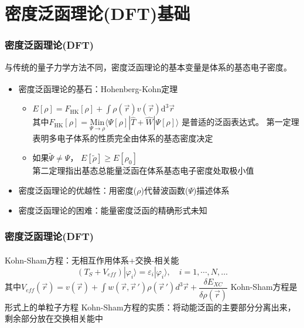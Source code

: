 \documentclass[cjk,slidestop,compress,mathserif,blue]{beamer}
\newcommand{\upcite}[1]{\hspace{0ex}\textsuperscript{\cite{#1}}} %
\begin{document}
\section{密度泛函理论(DFT)基础}       %
\frame                               %
{
\frametitle{密度泛函理论(\textrm{DFT})} %
与传统的量子力学方法不同，密度泛函理论的基本变量是体系的基态电子密度。%
\begin{itemize}%
	\item 密度泛函理论的基石：\textrm{Hohenberg-Kohn}定理\upcite{PR136-B864_1964}
\vskip 10pt
\begin{itemize}%
   \setlength{\itemsep}{15pt}
 \item $E[\rho]=F_{\mathrm{HK}}[\rho]+\displaystyle\int\rho(\vec{r})v(\vec{r})\textrm{d}^{3}\vec{r}$ \\
\vskip 5pt 其中$F_{\mathrm{HK}}[\rho]=\underset{\Psi\to\rho}{\mathrm{Min}}\langle\Psi[\rho]|\hat{T}+\hat{W}|\Psi[\rho]\rangle$
是普适的泛函表达式。%
     \textrm{\small{第一定理表明多电子体系的性质完全由体系的基态密度决定}}
   \item 如果$\tilde\Psi\neq\Psi$，
     $E[\tilde\rho]\geqslant E[\rho_0]$\\
     \textrm{\small{第二定理指出基态总能量泛函在体系基态电子密度处取极小值}}
   \end{itemize}
\vskip 15pt
 \item 密度泛函理论的优越性：用密度($\rho$)代替波函数($\Psi$)描述体系
\vskip 10pt
 \item 密度泛函理论的困难：能量密度泛函的精确形式未知
   \end{itemize}
}
\frame                               %
{
\frametitle{密度泛函理论(\textrm{DFT})}
\textrm{Kohn-Sham}方程\upcite{PR140-A1133_1965}：无相互作用体系+交换-相关能
$$(T_S+V_{e\!f\!f})|\varphi_i\rangle=\varepsilon_i|\varphi_i\rangle,\quad i=1,\cdots,N,\dots$$
其中$V_{e\!f\!f}(\vec r)=v(\vec r)+\displaystyle\int w(\vec r,\vec r\,')\rho(\vec r\,')d^3\vec r+\dfrac{\delta E_{XC}}{\delta\rho(\vec r)}$
\vskip 10pt
\textrm{Kohn-Sham}方程是形式上的单粒子方程
\vskip 20pt
\textrm{Kohn-Sham}方程的实质：将动能泛函的主要部分分离出来，剩余部分放在交换相关能中
}
\frame                               %
\end{document}
